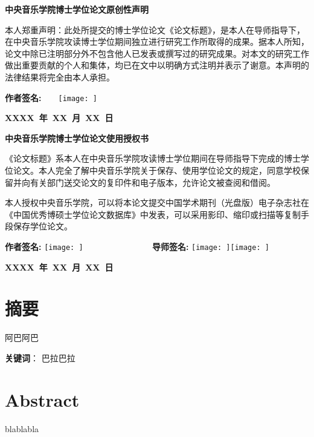 \documentclass[a4paper,scheme=chinese,linespread=1.6]{ctexbook}
\newcommand{\thetitle}{论文标题}
\begin{document}
{\large%

\setlength{\columnsep}{0pt}

{\centering \fontsize{16pt}{16pt}\textbf{中央音乐学院博士学位论文原创性声明}\par}
\vspace{0.3cm}
本人郑重声明：此处所提交的博士学位论文《\thetitle 》，是本人在导师指导下，在中央音乐学院攻读博士学位期间独立进行研究工作所取得的成果。据本人所知，论文中除已注明部分外不包含他人已发表或撰写过的研究成果。对本文的研究工作做出重要贡献的个人和集体，均已在文中以明确方式注明并表示了谢意。本声明的法律结果将完全由本人承担。

\begin{multicols}{2}
\vfill\null
\columnbreak
\textbf{作者签名:}~~~~\texttt{[image: ]} %
\par
\vspace{0.3cm}
\end{multicols}
\hfill \textbf{XXXX~年~XX~月~XX~日}
\vfill

{\centering \fontsize{16pt}{16pt}\textbf{中央音乐学院博士学位论文使用授权书}\par}
\vspace{0.3cm}
《\thetitle 》系本人在中央音乐学院攻读博士学位期间在导师指导下完成的博士学位论文。本人完全了解中央音乐学院关于保存、使用学位论文的规定，同意学校保留并向有关部门送交论文的复印件和电子版本，允许论文被查阅和借阅。

本人授权中央音乐学院，可以将本论文提交中国学术期刊（光盘版）电子杂志社在《中国优秀博硕士学位论文数据库》中发表，可以采用影印、缩印或扫描等复制手段保存学位论文。

\textbf{作者签名: }\texttt{[image: ]} %
~~~~~~~~~~~~~~~
\textbf{导师签名: }\texttt{[image: ]}\texttt{[image: ]} %
\par
\hspace{1cm}

\hfill \textbf{XXXX~年~XX~月~XX~日}
\chapter*{摘要}
阿巴阿巴
\pagestyle{plain}





\textbf{关键词}：
巴拉巴拉
\chapter*{Abstract}
blablabla

}
\end{document}
